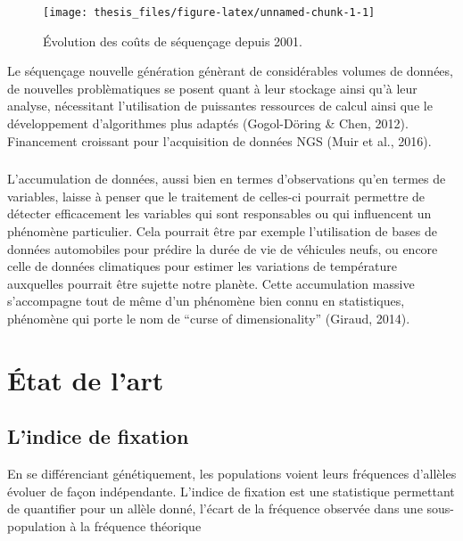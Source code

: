 \documentclass[12pt,twoside]{reedthesis}
\begin{document}
  \begin{figure}
  
  {\centering \texttt{[image: thesis\_files/figure-latex/unnamed-chunk-1-1]} 
  
  }
  
  \caption{Évolution des coûts de séquençage depuis 2001.}\label{fig:unnamed-chunk-1}
  \end{figure}
  
  Le séquençage nouvelle génération génèrant de considérables volumes de
  données, de nouvelles problèmatiques se posent quant à leur stockage
  ainsi qu'à leur analyse, nécessitant l'utilisation de puissantes
  ressources de calcul ainsi que le développement d'algorithmes plus
  adaptés (Gogol-Döring \& Chen, 2012). Financement croissant pour
  l'acquisition de données NGS (Muir et al., 2016).
  
  \subsection{}\label{section}
  
  L'accumulation de données, aussi bien en termes d'observations qu'en
  termes de variables, laisse à penser que le traitement de celles-ci
  pourrait permettre de détecter efficacement les variables qui sont
  responsables ou qui influencent un phénomène particulier. Cela pourrait
  être par exemple l'utilisation de bases de données automobiles pour
  prédire la durée de vie de véhicules neufs, ou encore celle de données
  climatiques pour estimer les variations de température auxquelles
  pourrait être sujette notre planète. Cette accumulation massive
  s'accompagne tout de même d'un phénomène bien connu en statistiques,
  phénomène qui porte le nom de ``curse of dimensionality'' (Giraud,
  2014).
  
  \chapter{État de l'art}\label{etat-de-lart}
  
  \section{L'indice de fixation}\label{lindice-de-fixation}
  
  En se différenciant génétiquement, les populations voient leurs
  fréquences d'allèles évoluer de façon indépendante. L'indice de fixation
  est une statistique permettant de quantifier pour un allèle donné,
  l'écart de la fréquence observée dans une sous-population à la fréquence
  théorique
  
\end{document}
